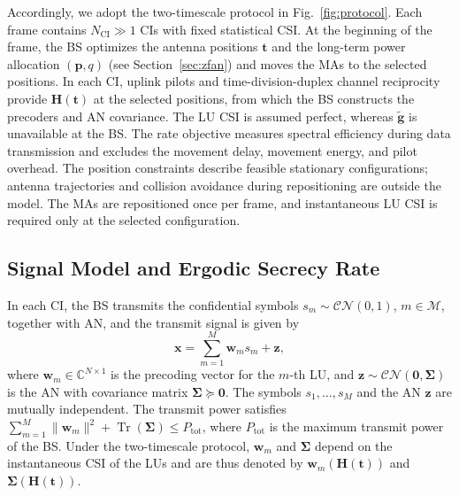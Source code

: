 \documentclass[journal]{IEEEtran}
\newcommand{\CN}{\mathcal{CN}}
\newcommand{\tr}{\operatorname{Tr}}
\newcommand{\bt}{\mathbf{t}}
\newcommand{\gtl}{\tilde{\mathbf{g}}}
\newcommand{\bH}{\mathbf{H}}
\newcommand{\bw}{\mathbf{w}}
\newcommand{\bp}{\mathbf{p}}
\newcommand{\bx}{\mathbf{x}}
\newcommand{\bz}{\mathbf{z}}
\newcommand{\bSig}{\boldsymbol{\Sigma}}
\newcommand{\Ptot}{P_{\mathrm{tot}}}
\begin{document}
Accordingly, we adopt the two-timescale protocol in Fig.~\ref{fig:protocol}. Each frame contains $N_{\mathrm{CI}}\gg1$ CIs with fixed statistical CSI. At the beginning of the frame, the BS optimizes the antenna positions $\bt$ and the long-term power allocation $(\bp,q)$ (see Section~\ref{sec:zfan}) and moves the MAs to the selected positions. In each CI, uplink pilots and time-division-duplex channel reciprocity provide $\bH(\bt)$ at the selected positions, from which the BS constructs the precoders and AN covariance. The LU CSI is assumed perfect, whereas $\gtl$ is unavailable at the BS. The rate objective measures spectral efficiency during data transmission and excludes the movement delay, movement energy, and pilot overhead. The position constraints describe feasible stationary configurations; antenna trajectories and collision avoidance during repositioning are outside the model. The MAs are repositioned once per frame, and instantaneous LU CSI is required only at the selected configuration.

\subsection{Signal Model and Ergodic Secrecy Rate}

In each CI, the BS transmits the confidential symbols $s_m\sim\CN(0,1)$, $m\in\mathcal M$, together with AN, and the transmit signal is given by
\begin{equation}\label{eq:x}
\bx=\sum_{m=1}^{M}\bw_m s_m+\bz,
\end{equation}
where $\bw_m\in\mathbb C^{N\times1}$ is the precoding vector for the $m$-th LU, and $\bz\sim\CN(\mathbf 0,\bSig)$ is the AN with covariance matrix $\bSig\succeq\mathbf 0$. The symbols $s_1,\ldots,s_M$ and the AN $\bz$ are mutually independent. The transmit power satisfies $\sum_{m=1}^M\|\bw_m\|^2+\tr(\bSig)\le\Ptot$, where $\Ptot$ is the maximum transmit power of the BS. Under the two-timescale protocol, $\bw_m$ and $\bSig$ depend on the instantaneous CSI of the LUs and are thus denoted by $\bw_m(\bH(\bt))$ and $\bSig(\bH(\bt))$.
\end{document}
